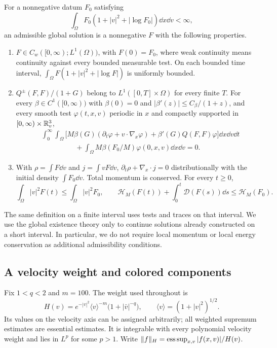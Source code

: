 \begin{definition}\label{def:admissible}
For a nonnegative datum \(F_0\) satisfying
\[
\int_\Omega F_0(1+|v|^2+|\log F_0|)\dd x\dd v<\infty,
\]
an admissible global solution is a nonnegative \(F\) with the following
properties.
\begin{enumerate}[label=\textup{(\roman*)}]
\item \(F\in C_w([0,\infty);L^1(\Omega))\), with \(F(0)=F_0\), where
weak continuity means continuity against every bounded measurable test.
On each bounded time interval,
\(\int_\Omega F(1+|v|^2+|\log F|)\) is uniformly bounded.
\item \(Q^\pm(F,F)/(1+G)\) belong to
\(L^1([0,T]\times\Omega)\) for every finite \(T\).
For every \(\beta\in C^1([0,\infty))\) with \(\beta(0)=0\) and
\(|\beta'(z)|\le C_\beta/(1+z)\), and every smooth test
\(\varphi(t,x,v)\) periodic in \(x\) and compactly supported in
\([0,\infty)\times\mathbb R^3_v\),
\[
\begin{split}
&\int_0^\infty\!\!\int_\Omega
 \bigl[M\beta(G)(\partial_t\varphi+v\cdot\nabla_x\varphi)
      +\beta'(G)Q(F,F)\varphi\bigr]\dd x\dd v\dd t\\
&\hspace{2cm}
+\int_\Omega M\beta(F_0/M)\varphi(0,x,v)\dd x\dd v=0 .
\end{split}
\]
\item With \(\rho=\int F\dd v\) and \(j=\int vF\dd v\),
\(\partial_t\rho+\nabla_x\cdot j=0\) distributionally with the initial
density \(\int F_0\dd v\). Total momentum is conserved. For every \(t\ge0\),
\[
\int_\Omega |v|^2F(t)\le\int_\Omega |v|^2F_0,\qquad
\mathcal H_M(F(t))+\int_0^t\mathcal D(F(s))\dd s
 \le\mathcal H_M(F_0).
\]
\end{enumerate}
\end{definition}

The same definition on a finite interval uses tests and traces on that
interval. We use the global existence theory
\cite{DiPernaLions1989,DiPernaLions1991,LevermoreMasmoudi2010} only to
continue solutions already constructed on a short interval. In particular,
we do not require local momentum or local energy conservation as additional
admissibility conditions.

\subsection{A velocity weight and colored components}

Fix \(1<q<2\) and \(m=100\). The weight used throughout is
\begin{equation}\label{eq:weight}
H(v)=e^{-|v|^2}\langle v\rangle^{-m}
       \bigl(1+|\bar v|^{-q}\bigr),\qquad
\langle v\rangle=(1+|v|^2)^{1/2}.
\end{equation}
Its values on the velocity axis can be assigned arbitrarily; all weighted
supremum estimates are essential estimates. It is integrable with every
polynomial velocity weight and lies in \(L^p\) for some \(p>1\).
Write \(\|f\|_H=\operatorname*{ess\,sup}_{x,v}|f(x,v)|/H(v)\).

